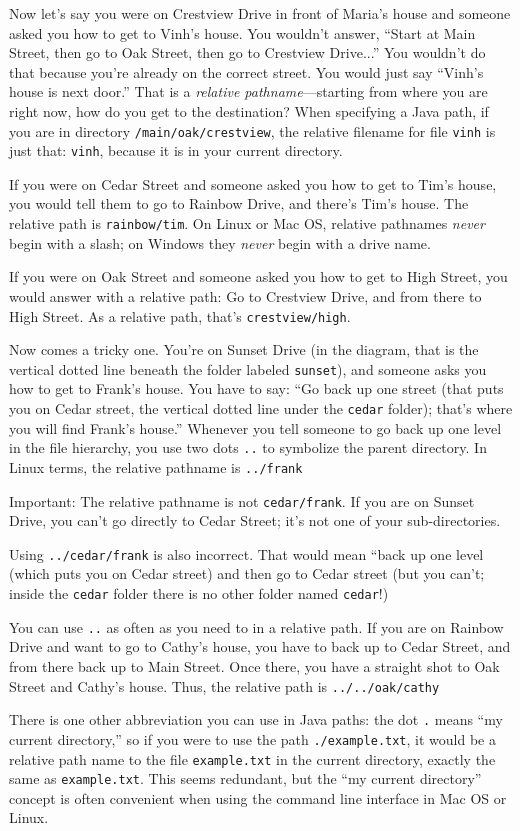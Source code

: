 Now let's say you were on Crestview Drive in front of Maria's house and someone asked you how to get to Vinh's house. You wouldn't answer, ``Start at Main Street, then go to Oak Street, then go to Crestview Drive...'' You wouldn't do that because you're already on the correct street. You would just say ``Vinh's house is next door.'' That is a {\em relative pathname}---starting from where you are right now, how do you get to the destination? When specifying a Java path, if you are in directory \texttt{/main/oak/crestview}, the relative filename for file \texttt{vinh} is just that: \texttt{vinh}, because it is in your current directory.

If you were on Cedar Street and someone asked you how to get to Tim's house, you would tell them to go to Rainbow Drive, and there's Tim's house. The relative path is \texttt{rainbow/tim}. On Linux or Mac OS, relative pathnames {\em never} begin with a slash; on Windows they {\em never} begin with a drive name.

If you were on Oak Street and someone asked you how to get to High Street, you would answer with a relative path: Go to Crestview Drive, and from there to High Street. As a relative path, that's \texttt{crestview/high}.

Now comes a tricky one. You're on Sunset Drive (in the diagram, that is the vertical dotted line beneath the folder labeled \texttt{sunset}), and someone asks you how to get to Frank's house. You have to say: ``Go back up one street (that puts you on Cedar street, the vertical dotted line under the \texttt{cedar} folder); that's where you will find Frank's house.'' Whenever you tell someone to go back up one level in the file hierarchy, you use two dots \texttt{..} to symbolize the parent directory. In Linux terms, the relative pathname is \texttt{../frank}

Important: The relative pathname is not \texttt{cedar/frank}. If you are on Sunset Drive, you can't go directly to Cedar Street; it's not one of your sub-directories.

Using \texttt{../cedar/frank} is also incorrect. That would mean ``back up one level (which puts you on Cedar street) and then go to Cedar street (but you can't; inside the \texttt{cedar} folder there is no other folder named \texttt{cedar}!)

You can use \texttt{..} as often as you need to in a relative path. If you are on Rainbow Drive and want to go to Cathy's house, you have to back up to Cedar Street, and from there back up to Main Street. Once there, you have a straight shot to Oak Street and Cathy's house. Thus, the relative path is \texttt{../../oak/cathy}

There is one other abbreviation you can use in Java paths: the dot \texttt{.} means ``my current directory,'' so if you were to use the path \texttt{./example.txt}, it would be a relative path name to the file \texttt{example.txt} in the current directory, exactly the same as \texttt{example.txt}. This seems redundant, but the ``my current directory'' concept is often convenient when using the command line interface in Mac OS or Linux. 
